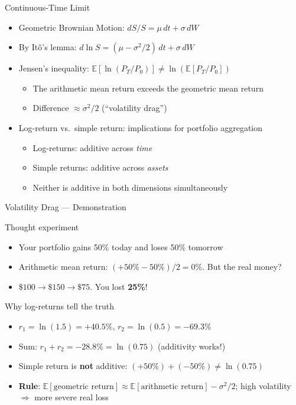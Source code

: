 \documentclass[9pt, aspectratio=169, t]{beamer}
\theoremstyle{definition}
\newcommand{\E}{\mathbb{E}}
\begin{document}
\begin{frame}{Continuous-Time Limit}
\begin{itemize}
\item Geometric Brownian Motion: $dS/S = \mu\,dt + \sigma\,dW$
\item By It\^{o}'s lemma: $d\ln S = (\mu - \sigma^2/2)\,dt + \sigma\,dW$
\item Jensen's inequality: $\E[\ln(P_T/P_0)] \neq \ln(\E[P_T/P_0])$
\begin{itemize}
\item The arithmetic mean return exceeds the geometric mean return
\item Difference $\approx \sigma^2/2$ (``volatility drag'')
\end{itemize}
\item Log-return vs.\ simple return: implications for portfolio aggregation
\begin{itemize}
\item Log-returns: additive across \textit{time}
\item Simple returns: additive across \textit{assets}
\item Neither is additive in both dimensions simultaneously
\end{itemize}
\end{itemize}
\end{frame}

\begin{frame}{Volatility Drag --- Demonstration}
\begin{exampleblock}{Thought experiment}
\begin{itemize}\setlength\itemsep{2pt}
\item Your portfolio gains 50\% today and loses 50\% tomorrow
\item Arithmetic mean return: $(+50\% - 50\%)/2 = 0\%$. But the real money?
\item $\$100 \to \$150 \to \$75$. You lost \textbf{25\%}!
\end{itemize}
\end{exampleblock}
\begin{block}{Why log-returns tell the truth}
\begin{itemize}\setlength\itemsep{2pt}
\item $r_1 = \ln(1.5) = +40.5\%$, \quad $r_2 = \ln(0.5) = -69.3\%$
\item Sum: $r_1 + r_2 = -28.8\% = \ln(0.75)$ \checkmark \quad (additivity works!)
\item Simple return is \textbf{not} additive: $(+50\%) + (-50\%) \neq \ln(0.75)$
\item \textbf{Rule}: $\E[\text{geometric return}] \approx \E[\text{arithmetic return}] - \sigma^2/2$; high volatility $\Rightarrow$ more severe real loss
\end{itemize}
\end{block}
\end{frame}
\end{document}
